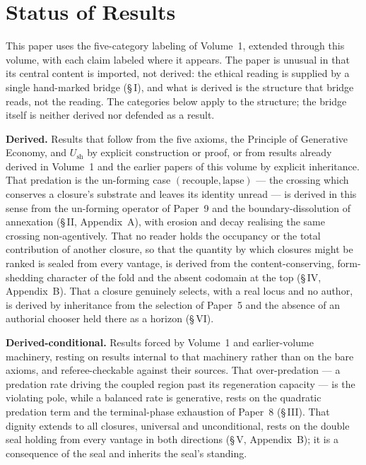 \documentclass[11pt,oneside]{report}
\theoremstyle{definition}
\theoremstyle{remark}
\begin{document}
\section*{Status of Results}

This paper uses the five-category labeling of Volume~1, extended through this volume, with each claim labeled where it appears. The paper is unusual in that its central content is imported, not derived: the ethical reading is supplied by a single hand-marked bridge (\S\,I), and what is derived is the structure that bridge reads, not the reading. The categories below apply to the structure; the bridge itself is neither derived nor defended as a result.

\textbf{Derived.} Results that follow from the five axioms, the Principle of Generative Economy, and \ensuremath{U_{\mathrm{sh}}} by explicit construction or proof, or from results already derived in Volume~1 and the earlier papers of this volume by explicit inheritance. That predation is the un-forming case \ensuremath{(\text{recouple}, \text{lapse})} --- the crossing which conserves a closure's substrate and leaves its identity unread --- is derived in this sense from the un-forming operator of Paper~9 and the boundary-dissolution of annexation (\S\,II, Appendix~A), with erosion and decay realising the same crossing non-agentively. That no reader holds the occupancy or the total contribution of another closure, so that the quantity by which closures might be ranked is sealed from every vantage, is derived from the content-conserving, form-shedding character of the fold and the absent codomain at the top (\S\,IV, Appendix~B). That a closure genuinely selects, with a real locus and no author, is derived by inheritance from the selection of Paper~5 and the absence of an authorial chooser held there as a horizon (\S\,VI).

\textbf{Derived-conditional.} Results forced by Volume~1 and earlier-volume machinery, resting on results internal to that machinery rather than on the bare axioms, and referee-checkable against their sources. That over-predation --- a predation rate driving the coupled region past its regeneration capacity --- is the violating pole, while a balanced rate is generative, rests on the quadratic predation term and the terminal-phase exhaustion of Paper~8 (\S\,III). That dignity extends to all closures, universal and unconditional, rests on the double seal holding from every vantage in both directions (\S\,V, Appendix~B); it is a consequence of the seal and inherits the seal's standing.
\end{document}
